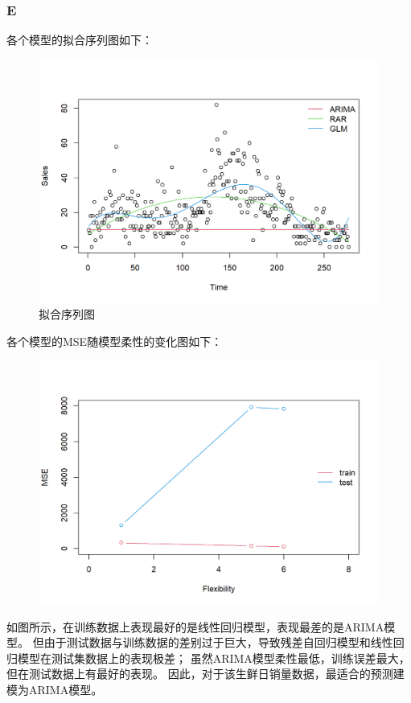 \documentclass[12pt,a4paper]{article}
\begin{document}
    \subsubsection*{E}
    各个模型的拟合序列图如下：
    \begin{figure}[H]
        \centering
        \includegraphics[scale=0.8]{FreshFitting.png}
        \caption*{拟合序列图}
    \end{figure}
    各个模型的MSE随模型柔性的变化图如下：
    \begin{figure}[H]
        \centering
        \includegraphics[scale=0.8]{FreshMSEFlexibility.png}
    \end{figure}
    如图所示，在训练数据上表现最好的是线性回归模型，表现最差的是ARIMA模型。
    但由于测试数据与训练数据的差别过于巨大，导致残差自回归模型和线性回归模型在测试集数据上的表现极差；
    虽然ARIMA模型柔性最低，训练误差最大，但在测试数据上有最好的表现。
    因此，对于该生鲜日销量数据，最适合的预测建模为ARIMA模型。
\end{document}
